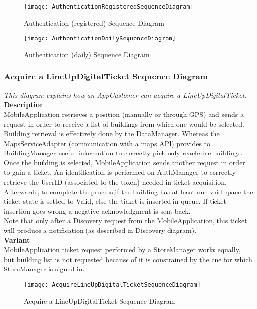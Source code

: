 \begin{figure}[H]
 \centering
 \texttt{[image: AuthenticationRegisteredSequenceDiagram]}
 \caption{ Authentication (registered) Sequence Diagram}
 \end{figure}

\newpage
\begin{figure}[H]
 \centering
 \texttt{[image: AuthenticationDailySequenceDiagram]}
 \caption{Authentication (daily) Sequence Diagram}
 \end{figure}

\newpage
\subsubsection{ Acquire a LineUpDigitalTicket Sequence Diagram}
\textit{This diagram explains how an AppCustomer can acquire a LineUpDigitalTicket.\\}
\textbf{Description\\}
MobileApplication retrieves a position (manually or through GPS) and sends a request in order to receive a list of buildings from which one would be selected. Building retrieval is effectively done by the DataManager. Whereas the MapsServiceAdapter (communication with a maps API) provides to BuildingManager useful information to correctly pick only reachable buildings.\\
Once the building is selected, MobileApplication sends another request in order to gain a ticket. An identification is performed on AuthManager to correctly retrieve the UserID (associated to the token) needed in ticket acquisition. Afterwards, to complete the process,if the building has at least one void space the ticket state is setted to Valid, else the ticket is inserted in queue.
If ticket insertion goes wrong a negative acknowledgment is sent back.\\
Note that only after a Discovery request from the MobileApplication, this ticket will produce a notification (as described in Discovery diagram).\\
\textbf{Variant\\}
MobileApplication ticket request performed by a StoreManager works equally, but building list is not requested because of it is constrained by the one for which StoreManager is signed in. \\

\begin{figure}[H]
 \centering
 \texttt{[image: AcquireLineUpDigitalTicketSequenceDiagram]}
 \caption{ Acquire a LineUpDigitalTicket Sequence Diagram}
 \end{figure}


